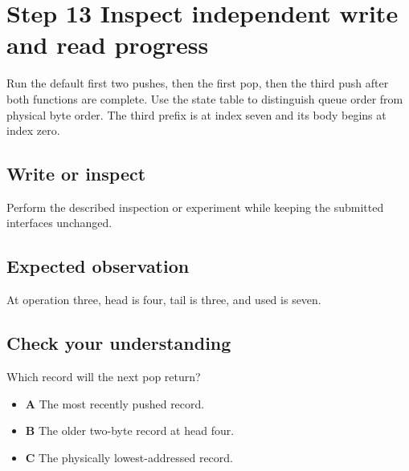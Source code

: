 \section{Step 13 Inspect independent write and read progress}\label{ring-s13}

Run the default first two pushes, then the first pop, then the third push after both functions are complete. Use the state table to distinguish queue order from physical byte order. The third prefix is at index seven and its body begins at index zero.

\subsection{Write or inspect}
Perform the described inspection or experiment while keeping the submitted interfaces unchanged.

\subsection{Expected observation}
At operation three, head is four, tail is three, and used is seven.

\subsection{Check your understanding}
Which record will the next pop return?

\begin{itemize}
  \item \textbf{A} The most recently pushed record.
  \item \textbf{B} The older two-byte record at head four.
  \item \textbf{C} The physically lowest-addressed record.
\end{itemize}
